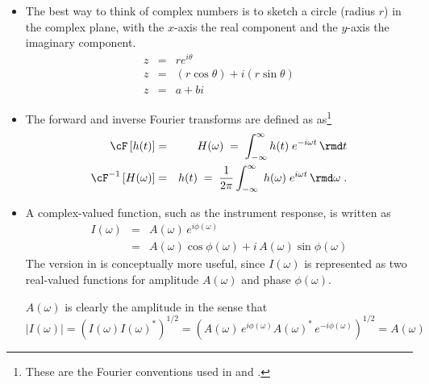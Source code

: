 \documentclass[11pt,titlepage,fleqn]{article}
\newcommand{\fft}{h}
\newcommand{\ffw}{H}
\begin{document}
\begin{itemize}
\item The best way to think of complex numbers is to sketch a circle (radius $r$) in the complex plane, with the $x$-axis the real component and the $y$-axis the imaginary component.
%
\begin{eqnarray*}
z &=& r e^{i\theta}
\\
z &=& (r\cos\theta) + i(r\sin\theta)
\\
z &=& a + bi
\end{eqnarray*}



\item The forward and inverse Fourier transforms are defined as as\footnote{These are the Fourier conventions used in \citet[][p.~109]{DT} and \citet[][Section 6.4.2]{SteinWysession}.}
%
\begin{eqnarray}
\cF \left[ \fft(t) \right] &=& \ffw(\omega)
\;=\; \int_{-\infty}^{\infty} \fft(t) \; e^{-i\omega t} \,\rmd t
\label{fft}
\\
\cF^{-1} \left[ \ffw(\omega) \right] &=& \fft(t) 
\;=\; \frac{1}{2\pi} \int_{-\infty}^{\infty} \; \fft(\omega) \; e^{i\omega t} \,\rmd\omega 
\label{ifft}
\;.
\end{eqnarray}


\item A complex-valued function, such as the instrument response, is written as
%
\begin{eqnarray}
I(\omega) &=& A(\omega)\,e^{i\phi(\omega)}
\label{Iw}
\\
&=& A(\omega)\cos\phi(\omega) + i\,A(\omega)\sin\phi(\omega)
\end{eqnarray}
%
The version in  is conceptually more useful, since $I(\omega)$ is represented as two real-valued functions for amplitude $A(\omega)$ and phase $\phi(\omega)$.

$A(\omega)$ is clearly the amplitude in the sense that
%
\begin{equation}
|I(\omega)| = \left( I(\omega) I(\omega)^* \right)^{1/2}
= \left( A(\omega)\,e^{i\phi(\omega)} A(\omega)^*\,e^{-i\phi(\omega)} \right)^{1/2}
= A(\omega)
\end{equation}

\end{itemize}

\end{document}
